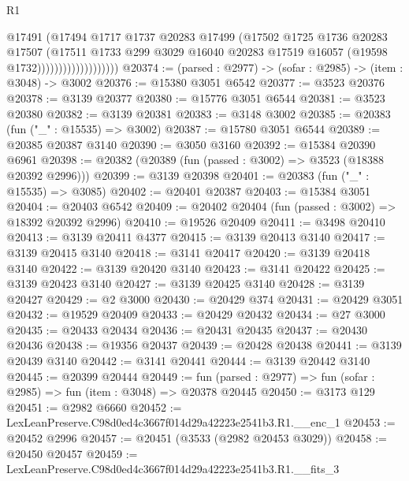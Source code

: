 \begin{lexlean}{R1}
\begin{coremodule}
                                  @17491
                                  (@17494
                                    @1717
                                    @1737
                                    @20283
                                    @17499
                                    (@17502
                                      @1725
                                      @1736
                                      @20283
                                      @17507
                                      (@17511
                                        @1733
                                        @299
                                        @3029
                                        @16040
                                        @20283
                                        @17519
                                        @16057
                                        (@19598 @1732)))))))))))))))))))
@20374 := (parsed : @2977) -> (sofar : @2985) -> (item : @3048) -> @3002
@20376 := @15380 @3051 @6542
@20377 := @3523 @20376
@20378 := @3139 @20377
@20380 := @15776 @3051 @6544
@20381 := @3523 @20380
@20382 := @3139 @20381
@20383 := @3148 @3002
@20385 := @20383 (fun ("_" : @15535) => @3002)
@20387 := @15780 @3051 @6544
@20389 := @20385 @20387 @3140
@20390 := @3050 @3160
@20392 := @15384 @20390 @6961
@20398 := @20382 (@20389 (fun (passed : @3002) => @3523 (@18388 @20392 @2996)))
@20399 := @3139 @20398
@20401 := @20383 (fun ("_" : @15535) => @3085)
@20402 := @20401 @20387
@20403 := @15384 @3051
@20404 := @20403 @6542
@20409 := @20402 @20404 (fun (passed : @3002) => @18392 @20392 @2996)
@20410 := @19526 @20409
@20411 := @3498 @20410
@20413 := @3139 @20411 @4377
@20415 := @3139 @20413 @3140
@20417 := @3139 @20415 @3140
@20418 := @3141 @20417
@20420 := @3139 @20418 @3140
@20422 := @3139 @20420 @3140
@20423 := @3141 @20422
@20425 := @3139 @20423 @3140
@20427 := @3139 @20425 @3140
@20428 := @3139 @20427
@20429 := @2 @3000
@20430 := @20429 @374
@20431 := @20429 @3051
@20432 := @19529 @20409
@20433 := @20429 @20432
@20434 := @27 @3000
@20435 := @20433 @20434
@20436 := @20431 @20435
@20437 := @20430 @20436
@20438 := @19356 @20437
@20439 := @20428 @20438
@20441 := @3139 @20439 @3140
@20442 := @3141 @20441
@20444 := @3139 @20442 @3140
@20445 := @20399 @20444
@20449 := fun (parsed : @2977) => fun (sofar : @2985) => fun (item : @3048) => @20378 @20445
@20450 := @3173 @129
@20451 := @2982 @6660
@20452 := LexLeanPreserve.C98d0ed4c3667f014d29a42223e2541b3.R1.__enc_1
@20453 := @20452 @2996
@20457 := @20451 (@3533 (@2982 @20453 @3029))
@20458 := @20450 @20457
@20459 := LexLeanPreserve.C98d0ed4c3667f014d29a42223e2541b3.R1.__fits_3

\end{coremodule}
\end{lexlean}
